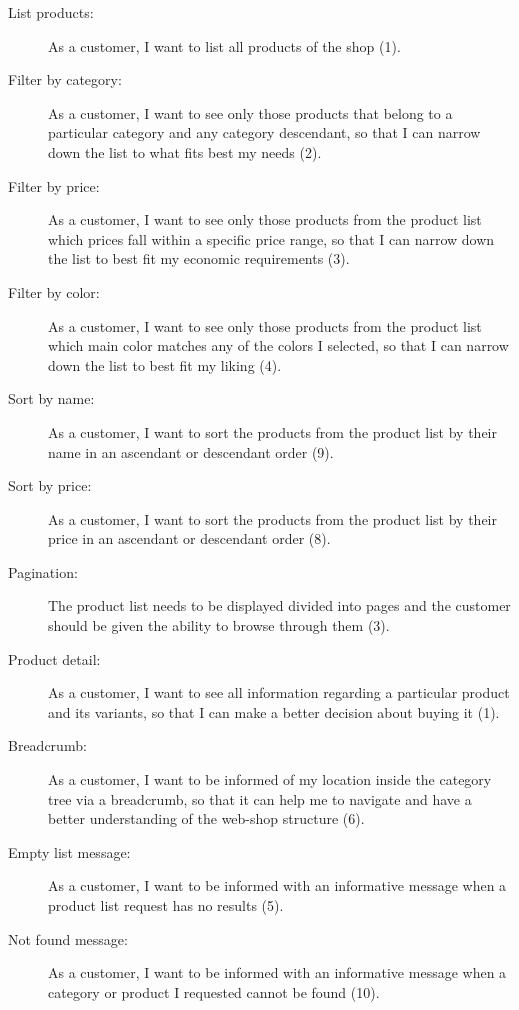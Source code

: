 \begin{description}
	\item[List products:] As a customer, I want to list all products of the shop (1).
	\item[Filter by category:] As a customer, I want to see only those products that belong to a particular category and any category descendant, so that I can narrow down the list to what fits best my needs (2).
	\item[Filter by price:] As a customer, I want to see only those products from the product list which prices fall within a specific price range, so that I can narrow down the list to best fit my economic requirements (3).
	\item[Filter by color:] As a customer, I want to see only those products from the product list which main color matches any of the colors I selected, so that I can narrow down the list to best fit my liking (4).
	\item[Sort by name:] As a customer, I want to sort the products from the product list by their name in an ascendant or descendant order (9).
	\item[Sort by price:] As a customer, I want to sort the products from the product list by their price in an ascendant or descendant order (8).
	\item[Pagination:] The product list needs to be displayed divided into pages and the customer should be given the ability to browse through them (3).
	\item[Product detail:] As a customer, I want to see all information regarding a particular product and its variants, so that I can make a better decision about buying it (1).
	\item[Breadcrumb:] As a customer, I want to be informed of my location inside the category tree via a breadcrumb, so that it can help me to navigate and have a better understanding of the web-shop structure (6).
	\item[Empty list message:] As a customer, I want to be informed with an informative message when a product list request has no results (5).
	\item[Not found message:] As a customer, I want to be informed with an informative message
when a category or product I requested cannot be found (10).
\end{description}

